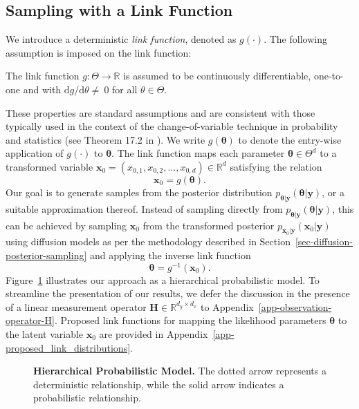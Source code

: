\subsection{Sampling with a Link Function}
\label{sec-sampling-link-function}
We introduce a deterministic \textit{link function}, denoted as $g(\cdot)$. The following assumption is imposed on the link function:
\begin{assumption}
\label{ass-link-function}
    The link function $g: \Theta \to \mathbb{R}$ is assumed to be continuously differentiable, one-to-one and with ${\mathrm{d}g}/{\mathrm{d}\theta}\neq~0$ for all $\theta\in\Theta$.
\end{assumption}
These properties are standard assumptions and are consistent with those typically used in the context of the change-of-variable technique in probability and statistics (see Theorem 17.2 in \citet{billingsley_prob}).
We write $g(\boldsymbol{\theta})$ to denote the entry-wise application of $g(\cdot)$ to $\boldsymbol{\theta}$. 
The link function maps each parameter $\boldsymbol{\theta}\in \Theta^{d}$ to a transformed variable $\mathbf{x}_{0}= (x_{0,1}, x_{0,2}, \dots, x_{0,d}) \in \mathbb{R}^d$ satisfying the relation 
\begin{equation} \label{eq:transformation_parameter}
    \mathbf{x}_0   = g(\boldsymbol{\theta}).
\end{equation}
Our goal is to generate samples from the posterior distribution $p_{\boldsymbol{\theta} \vert \mathbf{y}}(\boldsymbol{\theta} \vert \mathbf{y})$, or a suitable approximation thereof. Instead of sampling directly from $p_{\boldsymbol{\theta} \vert \mathbf{y}}(\boldsymbol{\theta} \vert \mathbf{y})$, this can be achieved by sampling $\mathbf{x}_0$ from the transformed posterior $p_{\mathbf{x}_0 \vert \mathbf{y}}(\mathbf{x}_0 \vert \mathbf{y})$ using diffusion models as per the methodology described in Section~\ref{sec-diffusion-posterior-sampling} and applying the inverse link function 
\begin{equation*}
    \boldsymbol{\theta} = g^{-1}(\mathbf{x}_0).
\end{equation*}
Figure~\ref{fig-graphical-model} illustrates our approach as a hierarchical probabilistic model.
To streamline the presentation of our results, we defer the discussion in the presence of a linear measurement operator $\mathbf{H} \in \mathbb{R}^{d_y \times d_x}$ to Appendix~\ref{app-observation-operator-H}.
Proposed link functions for mapping the likelihood parameters $\boldsymbol{\theta}$ to the latent variable  $\mathbf{x}_0 $ are provided in Appendix~\ref{app-proposed_link_distributions}.
\begin{figure}[t!]
\centering

\caption{\textbf{Hierarchical Probabilistic Model.} The dotted arrow represents a deterministic relationship, while the solid arrow indicates a probabilistic relationship.}
\label{fig-graphical-model}
\end{figure}




